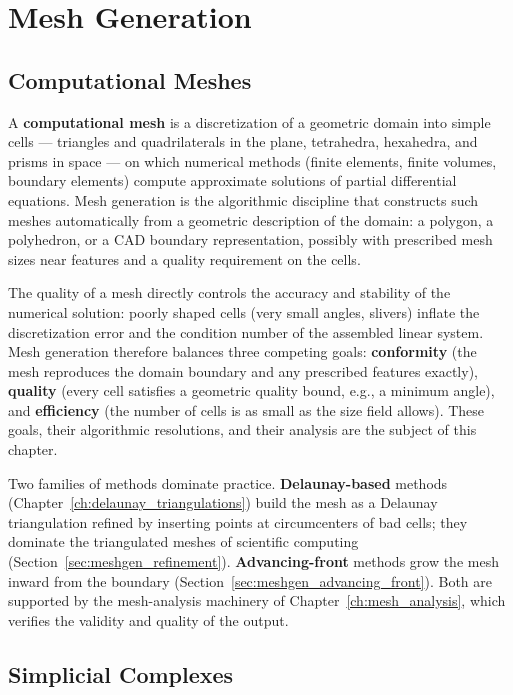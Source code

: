 \chapter{Mesh Generation}
\label{ch:mesh_generation}

\section{Computational Meshes}
\label{sec:meshgen_intro}

A \textbf{computational mesh} is a discretization of a geometric
domain into simple cells --- triangles and quadrilaterals in the plane,
tetrahedra, hexahedra, and prisms in space --- on which numerical methods
(finite elements, finite volumes, boundary elements) compute approximate
solutions of partial differential equations. Mesh generation is the
algorithmic discipline that constructs such meshes automatically from a
geometric description of the domain: a polygon, a polyhedron, or a CAD
boundary representation, possibly with prescribed mesh sizes near features
and a quality requirement on the cells.

The quality of a mesh directly controls the accuracy and stability of the
numerical solution: poorly shaped cells (very small angles, slivers) inflate
the discretization error and the condition number of the assembled linear
system. Mesh generation therefore balances three competing goals:
\textbf{conformity} (the mesh reproduces the domain boundary and any
prescribed features exactly), \textbf{quality} (every cell satisfies a
geometric quality bound, e.g., a minimum angle), and \textbf{efficiency}
(the number of cells is as small as the size field allows). These goals,
their algorithmic resolutions, and their analysis are the subject of this
chapter.

Two families of methods dominate practice. \textbf{Delaunay-based} methods
(Chapter~\ref{ch:delaunay_triangulations}) build the mesh as a Delaunay
triangulation refined by inserting points at circumcenters of bad cells;
they dominate the triangulated meshes of scientific computing
(Section~\ref{sec:meshgen_refinement}). \textbf{Advancing-front} methods
grow the mesh inward from the boundary (Section~\ref{sec:meshgen_advancing_front}).
Both are supported by the mesh-analysis machinery of
Chapter~\ref{ch:mesh_analysis}, which verifies the validity and quality of
the output.

\section{Simplicial Complexes}
\label{sec:meshgen_simplicial}

